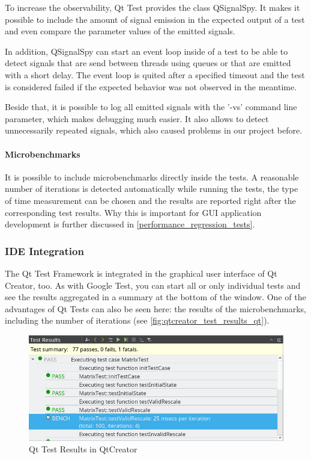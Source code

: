 \documentclass{scrreprt}
\begin{document}
To increase the observability, Qt Test provides the class QSignalSpy. It makes it possible to include the amount of signal emission in the expected output of a test and even compare the parameter values of the emitted signals.

In addition, QSignalSpy can start an event loop inside of a test to be able to detect signals that are send between threads using queues or that are emitted with a short delay. The event loop is quited after a specified timeout and the test is considered failed if the expected behavior was not observed in the meantime.

Beside that, it is possible to log all emitted signals with the '-vs' command line parameter, which makes debugging much easier. It also allows to detect unnecessarily repeated signals, which also caused problems in our project before.

\paragraph{Microbenchmarks}

It is possible to include microbenchmarks directly inside the tests. A reasonable number of iterations is detected automatically while running the tests, the type of time measurement can be chosen and the results are reported right after the corresponding test results. Why this is important for GUI application development is further discussed in \vref{performance_regression_tests}.


\subsubsection{IDE Integration}

The Qt Test Framework is integrated in the graphical user interface of Qt Creator, too. As with Google Test, you can start all or only individual tests and see the results aggregated in a summary at the bottom of the window. One of the advantages of Qt Tests can also be seen here: the results of the microbenchmarks, including the number of iterations (see \vref{fig:qtcreator_test_results_qt}).

\begin{figure}[h]
	\centering
	\includegraphics[width=1.0\textwidth]{img/qtcreator_test_results_qt}
	\caption[QtCreator Qt Test Results]{Qt Test Results in QtCreator}
	\label{fig:qtcreator_test_results_qt}
\end{figure}
\end{document}
